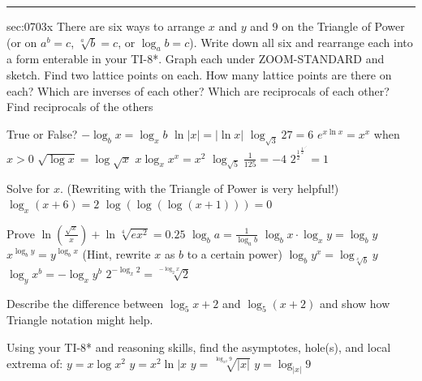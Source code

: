 \renewcommand{\columnseprule}{1.5pt}
\begin{multicols*}{2}
\rule[0.5\baselineskip]{0.4\textwidth}{1pt}
\noindent
\ExSection\label{sec:0703x}
\begin{exercises}{sec:0703x}
\prob[0703All6] There are six ways to arrange $x$ and $y$ and $9$ on the Triangle of Power (or on $a^b=c$, $\sqrt[a]{b}=c$, or $\log_a{b}=c$). Write down all six and rearrange each into a form enterable in your TI-8*.  
\subprob Graph each under ZOOM-STANDARD and sketch.
\subprob Find two lattice points on each.
\subprob How many lattice points are there on each?
\subprob Which are inverses of each other?
\subprob Which are reciprocals of each other?
\subprob Find reciprocals of the others


\prob[0703:LogProofs] True or False?
\subprob $-\log_b{x} = \log_x{b}$ 
\subprob$\ln{|x|} = |\ln{x}|$
\subprob $\log_{\sqrt{3}}{27} =6$
\subprob $e^{x\ln{x}} = x^x$ when $x>0$
\subprob $\sqrt{\log{x}} = \log{\sqrt{x}}$
\subprob $x\log_x{x^x} = x^2$
\subprob $\log_{\sqrt{5}}{\frac{1}{125}} = -4$
\subprob ${2^{\frac{1}{2}^{\frac{1}{2}^{\iddots}}}} = 1$



\prob[0703SolveLogs] Solve for $x$.  (Rewriting with the Triangle of Power is very helpful!)
\subprob $\log_x{(x+6)}=2$
\subprob $\log{\left(\log{\left(\log{(x+1)} \right)} \right)} = 0$ 


\prob[0703SimplifyLogs] Prove
\subprob $\ln{\left(\frac{\sqrt{x}}{x}\right)} + \ln{\sqrt[4]{ex^2}}=0.25$
\subprob $\log_b{a} = \frac{1}{\log_a{b}}$
\subprob $\log_b{x} \cdot{} \log_x{y} = \log_b{y}$
\subprob $x^{\log_b{y}} = y^{\log_b{x}}$  (Hint, rewrite $x$ as $b$ to a certain power)
\subprob $\log_b{y^x} = \log_{\sqrt[x]{b}}{y}$
\subprob $\log_y{x^b} = -\log_x{y^b}$
\subprob $2^{-\log_x{2}} = \sqrt[-\log_2{x}]{2}$


\prob[0703DescribeDifference] Describe the difference between $\log_5{x} + 2$ and $\log_5{(x+2)}$ and show how Triangle notation might help.

\prob[0703DescribeCalclog] Using your TI-8* and reasoning skills, find the asymptotes, hole(s), and local extrema of:
\subprob $y=x\log{x^2}$
\subprob $y=x^2\ln{|x}$
\subprob $y=\sqrt[\log_{x^2}{9}]{|x|}$
\subprob $y=\log_{|x|}{9}$



\end{exercises}
\end{multicols*}